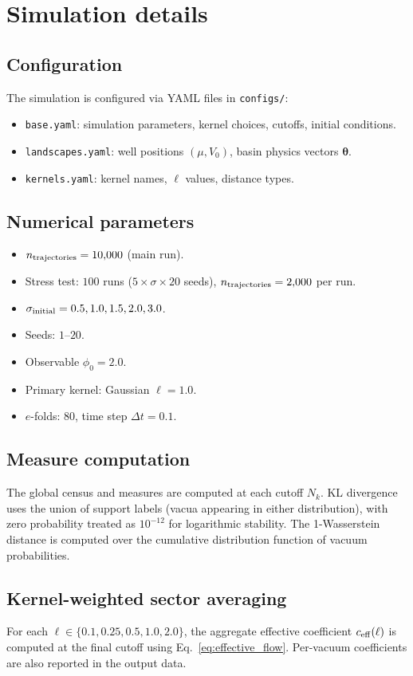 \section{Simulation details}
\label{app:simulation}

\subsection{Configuration}

The simulation is configured via YAML files in \texttt{configs/}:
\begin{itemize}
  \item \texttt{base.yaml}: simulation parameters, kernel choices, cutoffs,
        initial conditions.
  \item \texttt{landscapes.yaml}: well positions $(\mu, V_0)$, basin physics
        vectors $\boldsymbol{\theta}$.
  \item \texttt{kernels.yaml}: kernel names, $\ell$ values, distance types.
\end{itemize}

\subsection{Numerical parameters}

\begin{itemize}
  \item $n_{\rm trajectories} = 10,\!000$ (main run).
  \item Stress test: $100$ runs ($5 \times \sigma \times 20$ seeds),
        $n_{\rm trajectories} = 2,\!000$ per run.
  \item $\sigma_{\rm initial} = 0.5, 1.0, 1.5, 2.0, 3.0$.
  \item Seeds: $1$--$20$.
  \item Observable $\phi_0 = 2.0$.
  \item Primary kernel: Gaussian $\ell = 1.0$.
  \item $e$-folds: $80$, time step $\Delta t = 0.1$.
\end{itemize}

\subsection{Measure computation}

The global census and \ISR measures are computed at each cutoff $N_k$.
KL divergence uses the union of support labels (vacua appearing in either
distribution), with zero probability treated as $10^{-12}$ for
logarithmic stability.
The 1-Wasserstein distance is computed over the cumulative distribution
function of vacuum probabilities.

\subsection{Kernel-weighted sector averaging}

For each $\ell \in \{0.1, 0.25, 0.5, 1.0, 2.0\}$, the aggregate effective
coefficient $c_{\rm eff}(\ell)$ is computed at the final cutoff using
Eq.~\eqref{eq:effective_flow}.
Per-vacuum coefficients are also reported in the output data.
